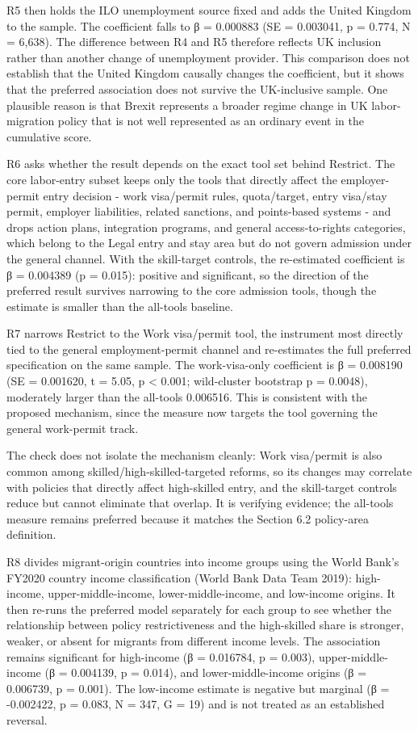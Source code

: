 \documentclass[11pt,a4paper]{article}
\begin{document}
R5 then holds the ILO unemployment source fixed and adds the United
Kingdom to the sample. The coefficient falls to β = 0.000883 (SE =
0.003041, p = 0.774, N = 6,638). The difference between R4 and R5
therefore reflects UK inclusion rather than another change of
unemployment provider. This comparison does not establish that the
United Kingdom causally changes the coefficient, but it shows that the
preferred association does not survive the UK-inclusive sample. One
plausible reason is that Brexit represents a broader regime change in UK
labor-migration policy that is not well represented as an ordinary event
in the cumulative score.

R6 asks whether the result depends on the exact tool set behind
Restrict. The core labor-entry subset keeps only the tools that directly
affect the employer-permit entry decision - work visa/permit rules,
quota/target, entry visa/stay permit, employer liabilities, related
sanctions, and points-based systems - and drops action plans,
integration programs, and general access-to-rights categories, which
belong to the Legal entry and stay area but do not govern admission
under the general channel. With the skill-target controls, the
re-estimated coefficient is β = 0.004389 (p = 0.015): positive and
significant, so the direction of the preferred result survives narrowing
to the core admission tools, though the estimate is smaller than the
all-tools baseline.

R7 narrows Restrict to the Work visa/permit tool, the instrument most
directly tied to the general employment-permit channel and re-estimates
the full preferred specification on the same sample. The work-visa-only
coefficient is β = 0.008190 (SE = 0.001620, t = 5.05, p \textless{}
0.001; wild-cluster bootstrap p = 0.0048), moderately larger than the
all-tools 0.006516. This is consistent with the proposed mechanism,
since the measure now targets the tool governing the general work-permit
track.

The check does not isolate the mechanism cleanly: Work visa/permit is
also common among skilled/high-skilled-targeted reforms, so its changes
may correlate with policies that directly affect high-skilled entry, and
the skill-target controls reduce but cannot eliminate that overlap. It
is verifying evidence; the all-tools measure remains preferred because
it matches the Section 6.2 policy-area definition.

R8 divides migrant-origin countries into income groups using the World
Bank's FY2020 country income classification (World Bank Data Team 2019):
high-income, upper-middle-income, lower-middle-income, and low-income
origins. It then re-runs the preferred model separately for each group
to see whether the relationship between policy restrictiveness and the
high-skilled share is stronger, weaker, or absent for migrants from
different income levels. The association remains significant for
high-income (β = 0.016784, p = 0.003), upper-middle-income (β =
0.004139, p = 0.014), and lower-middle-income origins (β = 0.006739, p =
0.001). The low-income estimate is negative but marginal (β = -0.002422,
p = 0.083, N = 347, G = 19) and is not treated as an established
reversal.
\end{document}
